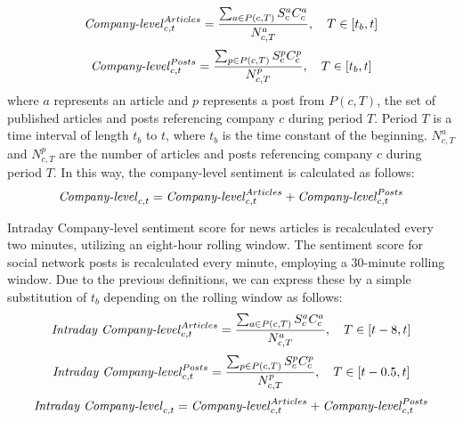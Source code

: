 \begin{description}
    \begin{equation}
        \label{eq:company-level-article-sentiment}
        \text{\textit{Company-level}}_{c,t}^{Articles} = \frac{\sum_{a \in P(c,T)} S_{c}^{a} C_{c}^{a}}{N_{c,T}^{a}}, \quad T \in [t_{b}, t]
    \end{equation}
    \begin{equation}
        \label{eq:company-level-post-sentiment}
        \text{\textit{Company-level}}_{c,t}^{Posts} = \frac{\sum_{p \in P(c,T)} S_{c}^{p} C_{c}^{p}}{N_{c,T}^{p}}, \quad T \in [t_{b}, t]
    \end{equation} where $a$ represents an article and $p$ represents a post from $P(c,T)$, the set of published articles and posts referencing company $c$ during period $T$. Period $T$ is a time interval of length $t_{b}$ to $t$, where $t_{b}$ is the time constant of the beginning. $N_{c,T}^{a}$ and $N_{c,T}^{p}$ are the number of articles and posts referencing company $c$ during period $T$. In this way, the company-level sentiment is calculated as follows:
    \begin{equation}
    \label{eq:company-level-sentiment}
    \text{\textit{Company-level}}_{c,t} = \text{\textit{Company-level}}_{c,t}^{Articles} + \text{\textit{Company-level}}_{c,t}^{Posts}
    \end{equation}
 \end{description}

Intraday Company-level sentiment score for news articles is recalculated every two minutes, utilizing an eight-hour rolling window. The sentiment score for social network posts is recalculated every minute, employing a 30-minute rolling window. Due to the previous definitions, we can express these by a simple substitution of $t_{b}$ depending on the rolling window as follows:
\begin{equation}
    \label{eq:intraday-company-level-article-sentiment}
    \text{\textit{Intraday Company-level}}_{c,t}^{Articles} = \frac{\sum_{a \in P(c,T)} S_{c}^{a} C_{c}^{a}}{N_{c,T}^{a}}, \quad T \in [t-8, t]
\end{equation}
\begin{equation}
    \label{eq:intraday-company-level-post-sentiment}
    \text{\textit{Intraday Company-level}}_{c,t}^{Posts} = \frac{\sum_{p \in P(c,T)} S_{c}^{p} C_{c}^{p}}{N_{c,T}^{p}}, \quad T \in [t-0.5, t]
\end{equation}
\begin{equation}
    \label{eq:intraday-company-level-sentiment}
    \text{\textit{Intraday Company-level}}_{c,t} = \text{\textit{Company-level}}_{c,t}^{Articles} + \text{\textit{Company-level}}_{c,t}^{Posts}
\end{equation}


